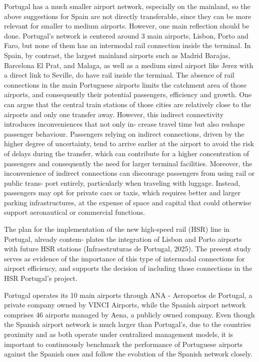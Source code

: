 Portugal has a much smaller airport network, especially on the mainland, so the above suggestions
for Spain are not directly transferable, since they can be more relevant for smaller to medium airports.
However, one main reflection should be done. Portugal's network is centered around 3 main airports, Lisbon, Porto and Faro, but none of them has an intermodal rail connection inside
the terminal. In Spain, by contrast, the largest mainland airports such as Madrid Barajas, Barcelona El
Prat, and Malaga, as well as a medium sized airport like Jerez with a direct link to Seville, do have rail
inside the terminal. The absence of rail connections in the main Portuguese airports limits the catchment
area of those airports, and consequently their potential passengers, efficiency and growth. One can argue that the central train stations of those cities are relatively close to the airports and
only one transfer away. However, this indirect connectivity introduces inconveniences that not only in-
crease travel time but also reshape passenger behaviour. Passengers relying on indirect connections,
driven by the higher degree of uncertainty, tend to arrive earlier at the airport to avoid the risk of delays
during the transfer, which can contribute for a higher concentration of passengers and consequently the
need for larger terminal facilities. Moreover,
the inconvenience of indirect connections can discourage passengers from using rail or public trans-
port entirely, particularly when traveling with luggage. Instead, passengers may opt for private cars or
taxis, which requires better and larger parking infrastructures, at the expense of space and capital that
could otherwise support aeronautical or commercial functions.

The plan for the implementation of the new high-speed rail (HSR) line in Portugal, already contem-
plates the integration of Lisbon and Porto airports with future HSR stations (Infraestruturas de Portugal,
2025). The present study serves as evidence of the importance of this type of intermodal connections
for airport efficiency, and supports the decision of including those connections in the HSR Portugal’s
project.

Portugal operates its 10 main airports through ANA - Aeroportos de Portugal, a private company
owned by VINCI Airports, while the Spanish airport network comprises 46 airports managed by Aena, a
publicly owned company. Even though the Spanish airport network is much larger than Portugal’s, due
to the countries proximity and as both operate under centralized management models, it is important to
continuously benchmark the performance of Portuguese airports against the Spanish ones and follow
the evolution of the Spanish network closely.

